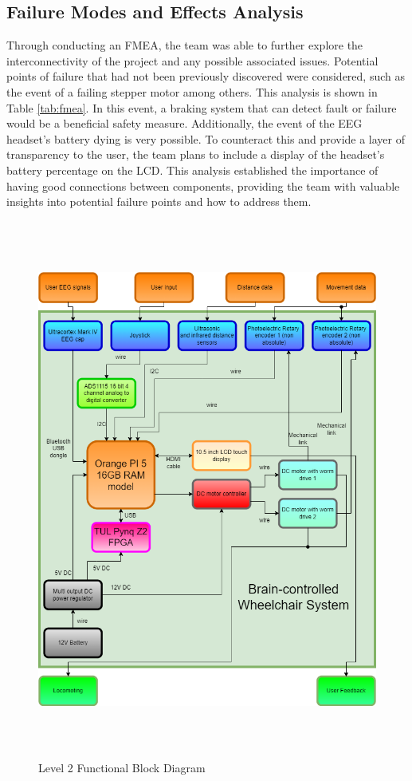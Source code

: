 \documentclass[conference]{IEEEtran}
\begin{document}
    \subsection{Failure Modes and Effects Analysis}
    Through conducting an FMEA, the team was able to further explore the interconnectivity of the project and any possible associated issues. Potential points of failure that had not been previously discovered were considered, such as the event of a failing stepper motor among others. This analysis is shown in Table \ref{tab:fmea}. In this event, a braking system that can detect fault or failure would be a beneficial safety measure. Additionally, the event of the EEG headset's battery dying is very possible. To counteract this and provide a layer of transparency to the user, the team plans to include a display of the headset's battery percentage on the LCD. This analysis established the importance of having good connections between components, providing the team with valuable insights into potential failure points and how to address them.   

    \onecolumn
    \begin{figure}
        \centering
        \centerline{\includegraphics[height=7in, keepaspectratio]{figs/level_2_diagram_1.png}}
        \caption{Level 2 Functional Block Diagram}
        \label{fig:level-2}
    \end{figure}
    
\end{document}
